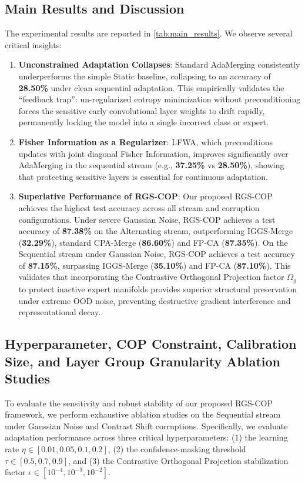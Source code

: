 \documentclass{article}
\theoremstyle{plain}
\theoremstyle{definition}
\theoremstyle{remark}
\begin{document}
\subsection{Main Results and Discussion}
The experimental results are reported in \cref{tab:main_results}. We observe several critical insights:
\begin{enumerate}
    \item \textbf{Unconstrained Adaptation Collapses}: Standard AdaMerging consistently underperforms the simple Static baseline, collapsing to an accuracy of \textbf{28.50\%} under clean sequential adaptation. This empirically validates the ``feedback trap'': un-regularized entropy minimization without preconditioning forces the sensitive early convolutional layer weights to drift rapidly, permanently locking the model into a single incorrect class or expert.
    \item \textbf{Fisher Information as a Regularizer}: LFWA, which preconditions updates with joint diagonal Fisher Information, improves significantly over AdaMerging in the sequential stream (e.g., \textbf{37.25\%} vs \textbf{28.50\%}), showing that protecting sensitive layers is essential for continuous adaptation.
    \item \textbf{Superlative Performance of RGS-COP}: Our proposed RGS-COP achieves the highest test accuracy across all stream and corruption configurations. Under severe Gaussian Noise, RGS-COP achieves a test accuracy of \textbf{87.38\%} on the Alternating stream, outperforming IGGS-Merge (\textbf{32.29\%}), standard CPA-Merge (\textbf{86.60\%}) and FP-CA (\textbf{87.35\%}). On the Sequential stream under Gaussian Noise, RGS-COP achieves a test accuracy of \textbf{87.15\%}, surpassing IGGS-Merge (\textbf{35.10\%}) and FP-CA (\textbf{87.10\%}). This validates that incorporating the Contrastive Orthogonal Projection factor $\Omega_g$ to protect inactive expert manifolds provides superior structural preservation under extreme OOD noise, preventing destructive gradient interference and representational decay.
\end{enumerate}

\subsection{Hyperparameter, COP Constraint, Calibration Size, and Layer Group Granularity Ablation Studies}
To evaluate the sensitivity and robust stability of our proposed RGS-COP framework, we perform exhaustive ablation studies on the Sequential stream under Gaussian Noise and Contrast Shift corruptions. Specifically, we evaluate adaptation performance across three critical hyperparameters: (1) the learning rate $\eta \in [0.01, 0.05, 0.1, 0.2]$, (2) the confidence-masking threshold $\tau \in [0.5, 0.7, 0.9]$, and (3) the Contrastive Orthogonal Projection stabilization factor $\epsilon \in [10^{-4}, 10^{-3}, 10^{-2}]$. 
\end{document}
